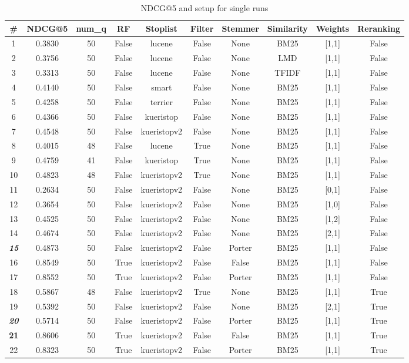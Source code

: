 \begin{table}[t]
	\caption{NDCG@5 and setup for single runs}
	\label{tab:results-table}
	\centering
	\begin{tabular}{|c||c|c||c|c|c|c|c|c|c|}
		\toprule
		\# & NDCG@5 & num\_q  & RF & Stoplist & Filter & Stemmer & Similarity & Weights & Reranking \\
		\midrule
		1 & 0.3830 & 50 & False & lucene & False & None & BM25 & [1,1] & False \\
		2 & 0.3756 & 50 & False & lucene & False & None & LMD & [1,1] & False \\
		3 & 0.3313 & 50 & False & lucene & False & None & TFIDF & [1,1] & False \\
		\hline
		4 & 0.4140 & 50 & False & smart & False & None & BM25 & [1,1] & False \\
		5 & 0.4258 & 50 & False & terrier & False & None & BM25 & [1,1] & False \\
		6 & 0.4366 & 50 & False & kueristop & False & None & BM25 & [1,1] & False \\
		7 & 0.4548 & 50 & False & kueristopv2 & False & None & BM25 & [1,1] & False \\
		\hline
		8 & 0.4015 & 48 & False & lucene & True & None & BM25 & [1,1] & False \\
		9 & 0.4759 & 41 & False & kueristop & True & None & BM25 & [1,1] & False \\
		10 & 0.4823 & 48 & False & kueristopv2 & True & None & BM25 & [1,1] & False \\
		\hline
		11 & 0.2634 & 50 & False & kueristopv2 & False & None & BM25 & [0,1] & False \\
		12 & 0.3654 & 50 & False & kueristopv2 & False & None & BM25 & [1,0] & False \\
		13 & 0.4525 & 50 & False & kueristopv2 & False & None & BM25 & [1,2] & False \\
		14 & 0.4674 & 50 & False & kueristopv2 & False & None & BM25 & [2,1] & False \\
		\hline
		\textit{\textbf{15}} & 0.4873 & 50 & False & kueristopv2 & False & Porter & BM25 & [1,1] & False \\
		\hline
		16 & 0.8549 & 50 & True & kueristopv2 & False & False & BM25 & [1,1] & False \\
		17 & 0.8552 & 50 & True & kueristopv2 & False & Porter & BM25 & [1,1] & False \\
		\hline
		18 & 0.5867 & 48 & False & kueristopv2 & True & None & BM25 & [1,1] & True \\
		19 & 0.5392 & 50 & False & kueristopv2 & False & None & BM25 & [2,1] & True \\
		\textit{\textbf{20}} & 0.5714 & 50 & False & kueristopv2 & False & Porter & BM25 & [1,1] & True \\
		\textbf{21} & 0.8606 & 50 & True & kueristopv2 & False & False & BM25 & [1,1] & True \\
		22 & 0.8323 & 50 & True & kueristopv2 & False & Porter & BM25 & [1,1] & True \\
		\bottomrule
	\end{tabular}
\end{table}

